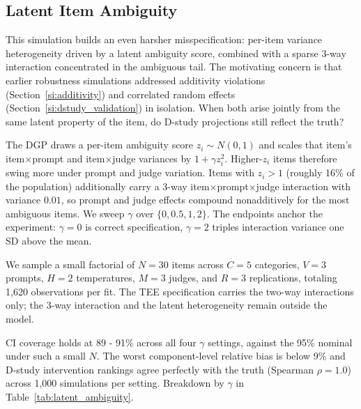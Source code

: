 \subsection{Latent Item Ambiguity}\label{si:latent_ambiguity}

This simulation builds an even harsher misspecification: per-item variance heterogeneity driven by a latent ambiguity score, combined with a sparse 3-way interaction concentrated in the ambiguous tail. The motivating concern is that earlier robustness simulations addressed additivity violations (Section~\ref{si:additivity}) and correlated random effects (Section~\ref{si:dstudy_validation}) in isolation. When both arise jointly from the same latent property of the item, do D-study projections still reflect the truth?

The DGP draws a per-item ambiguity score $z_i \sim N(0, 1)$ and scales that item's item$\times$prompt and item$\times$judge variances by $1 + \gamma z_i^2$. Higher-$z_i$ items therefore swing more under prompt and judge variation. Items with $z_i > 1$ (roughly 16\% of the population) additionally carry a 3-way item$\times$prompt$\times$judge interaction with variance $0.01$, so prompt and judge effects compound nonadditively for the most ambiguous items. We sweep $\gamma$ over $\{0, 0.5, 1, 2\}$. The endpoints anchor the experiment: $\gamma = 0$ is correct specification, $\gamma = 2$ triples interaction variance one SD above the mean.

We sample a small factorial of $N = 30$ items across $C = 5$ categories, $V = 3$ prompts, $H = 2$ temperatures, $M = 3$ judges, and $R = 3$ replications, totaling 1,620 observations per fit. The TEE specification carries the two-way interactions only; the 3-way interaction and the latent heterogeneity remain outside the model.

CI coverage holds at 89 - 91\% across all four $\gamma$ settings, against the 95\% nominal under such a small $N$. The worst component-level relative bias is below 9\% and D-study intervention rankings agree perfectly with the truth (Spearman $\rho = 1.0$) across 1{,}000 simulations per setting. Breakdown by $\gamma$ in Table~\ref{tab:latent_ambiguity}.

